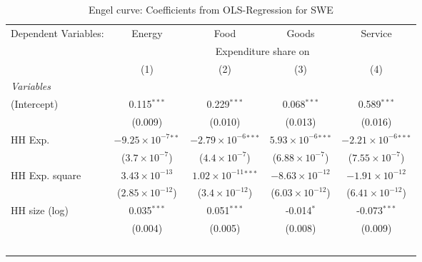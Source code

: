 
\begin{table}[htbp!]
   \centering
   \small
   \begin{adjustbox}{width = 1\textwidth, max height = 0.95\textheight, center}
      \begin{threeparttable}[b]
         \caption{\label{tab:Engel_parametric_SWE} Engel curve: Coefficients from OLS-Regression for SWE}
         \begin{tabular}{lcccc}
            \tabularnewline \midrule \midrule
            Dependent Variables: & Energy                        & Food                           & Goods                         & Service\\  
             & \multicolumn{4}{c}{Expenditure share on} \\ 
                                 & (1)                           & (2)                            & (3)                           & (4)\\  
            \midrule
            \emph{Variables}\\
            (Intercept)          & 0.115$^{***}$                 & 0.229$^{***}$                  & 0.068$^{***}$                 & 0.589$^{***}$\\   
                                 & (0.009)                       & (0.010)                        & (0.013)                       & (0.016)\\   
            HH Exp.              & $-9.25\times 10^{-7}$$^{**}$  & $-2.79\times 10^{-6}$$^{***}$  & $5.93\times 10^{-6}$$^{***}$  & $-2.21\times 10^{-6}$$^{***}$\\    
                                 & ($3.7\times 10^{-7}$)         & ($4.4\times 10^{-7}$)          & ($6.88\times 10^{-7}$)        & ($7.55\times 10^{-7}$)\\    
            HH Exp. square       & $3.43\times 10^{-13}$         & $1.02\times 10^{-11}$$^{***}$  & $-8.63\times 10^{-12}$        & $-1.91\times 10^{-12}$\\    
                                 & ($2.85\times 10^{-12}$)       & ($3.4\times 10^{-12}$)         & ($6.03\times 10^{-12}$)       & ($6.41\times 10^{-12}$)\\    
            HH size (log)        & 0.035$^{***}$                 & 0.051$^{***}$                  & -0.014$^{*}$                  & -0.073$^{***}$\\   
                                 & (0.004)                       & (0.005)                        & (0.008)                       & (0.009)\\   
$$
\end{tabular}
\end{threeparttable}
\end{adjustbox}
\end{table}
